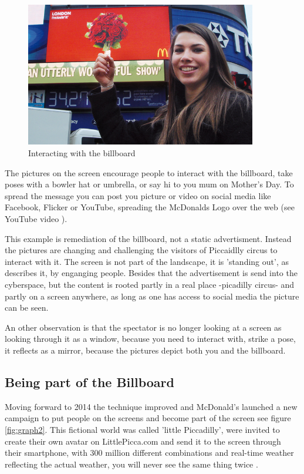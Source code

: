 \documentclass[a4paper, 11pt]{article}
\begin{document}
\begin{figure}[th]
    \centering
    \includegraphics[width=0.9\textwidth]{weights.png}
    \caption{Interacting with the billboard \citep{campaign2009}}
    \label{fig:graph1}
\end{figure}

The pictures on the screen encourage people to interact with the billboard, take poses with a bowler hat or umbrella, or say hi to you mum on Mother's Day. To spread the message you can post you picture or video on social media like Facebook, Flicker or YouTube, spreading the McDonalds Logo over the web (see YouTube video \citep{youtube2009}).  

This example is remediation of the billboard, not a static advertisment. Instead the pictures are changing and challenging the visitors of Piccaidlly circus to interact with it. The screen is not part of the landscape, it is 'standing out', as \cite{Slaatta2006} describes it, by enganging people. Besides that the advertisement is send into the cyberspace, but the content is rooted partly in a real place -picadilly circus- and partly on a screen anywhere, as long as one has access to social media the picture can be seen.  

An other observation is that the spectator is no longer looking at a screen as looking through it as a window, because you need to interact with, strike a pose, it reflects as a mirror, because the pictures depict both you and the billboard.


\subsection {Being part of the Billboard}
Moving forward to 2014 the technique improved and McDonald's launched a new campaign to put people on the screens and become part of the screen see figure \ref{fig:graph2}. This fictional world was called 'little Piccadilly', were invited to create their own avatar on LittlePicca.com and send it to the screen through their smartphone, with 300 million different combinations and real-time weather reflecting the actual weather, you will never see the same thing twice \citep{youtube2015}. 
\end{document}
